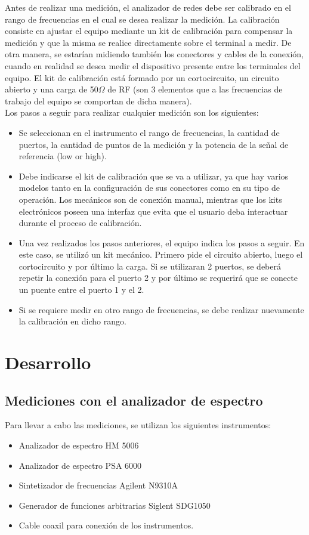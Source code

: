\documentclass[a4paper,10pt]{article}
\begin{document}
	\indent Antes de realizar una medici\'on, el analizador de redes debe ser 
	calibrado en el rango de frecuencias en el cual se desea realizar la 
	medici\'on. La calibraci\'on consiste en ajustar el equipo mediante un kit de 
	calibraci\'on para compensar la medici\'on y que la misma se realice 
	directamente sobre el terminal a medir. De otra manera, se estar\'ian midiendo
	tambi\'en los conectores y cables de la conexi\'on, cuando en realidad se desea 
	medir el dispositivo presente entre los terminales del equipo. El kit de calibraci\'on est\'a formado por un
	cortocircuito, un circuito abierto y una carga de 50$\Omega$ de RF (son 3 
	elementos que a las frecuencias de trabajo del equipo se comportan de dicha 
	manera). \\
	\indent Los pasos a seguir para realizar cualquier medici\'on son los 
	siguientes:
	
	\begin{itemize}
		\item Se seleccionan en el instrumento el rango de frecuencias, la 
		cantidad de puertos, la cantidad de puntos de la medici\'on y la potencia 
		de la se\~nal de referencia (low or high). 
		\item Debe indicarse el kit de calibraci\'on que se va a utilizar, ya que
		hay varios modelos tanto en la configuraci\'on de sus conectores como en 
		su tipo de operaci\'on. Los mec\'anicos son de conexi\'on manual, mientras que
		los kits electr\'onicos poseen una interfaz que evita que el usuario deba 
		interactuar durante el proceso de calibraci\'on. 
		\item Una vez realizados los pasos anteriores, el equipo indica los 
		pasos a seguir. En este caso, se utiliz\'o un kit mec\'anico. Primero pide 
		el circuito abierto, luego el cortocircuito y por \'ultimo la carga. Si se
		utilizaran 2 puertos, se deber\'a repetir la conexi\'on para el puerto 2 y 
		por \'ultimo se requerir\'a que se conecte un puente entre el puerto 1 y el 
		2. 
		\item Si se requiere medir en otro rango de frecuencias, se debe 
		realizar nuevamente la calibraci\'on en dicho rango. 
	\end{itemize}
	
\section{Desarrollo}
	\subsection{Mediciones con el analizador de espectro}
\indent Para llevar a cabo las mediciones, se utilizan los siguientes
		instrumentos:
		\begin{itemize}
			\item Analizador de espectro HM 5006
			\item Analizador de espectro PSA 6000
			\item Sintetizador de frecuencias Agilent N9310A
			\item Generador de funciones arbitrarias Siglent SDG1050
			\item Cable coaxil para conexi\'on de los instrumentos.
		\end{itemize}	
\end{document}
